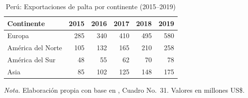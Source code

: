 \begin{table}[H]
\centering
\caption{Per\'u: Exportaciones de palta por continente (2015--2019)}
\label{tab:export_continente}
\small
\begin{tabular}{lrrrrr}
\toprule
\textbf{Continente} & \textbf{2015} & \textbf{2016} & \textbf{2017} & \textbf{2018} & \textbf{2019} \\
\midrule
Europa        & 285 & 340 & 410 & 495 & 580 \\
Am\'erica del Norte & 105 & 132 & 165 & 210 & 258 \\
Am\'erica del Sur  &  48 &  55 &  62 &  70 &  78 \\
Asia          &  85 & 102 & 125 & 148 & 175 \\
\bottomrule
\end{tabular}
\parbox{0.94\textwidth}{\small \textit{Nota.} Elaboraci\'on propia con base en \citep{SierraSelva2020}, Cuadro No.~31. Valores en millones US\$.}
\end{table}
